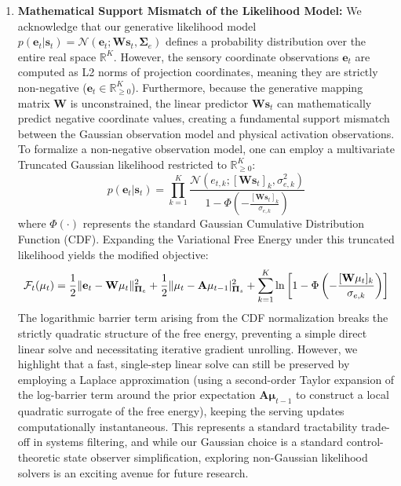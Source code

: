 \documentclass{article}
\theoremstyle{plain}
\theoremstyle{definition}
\theoremstyle{remark}
\begin{document}
\begin{enumerate}
    \item \textbf{Mathematical Support Mismatch of the Likelihood Model:} We acknowledge that our generative likelihood model $p(\mathbf{e}_t | \mathbf{s}_t) = \mathcal{N}(\mathbf{e}_t; \mathbf{W}\mathbf{s}_t, \mathbf{\Sigma}_e)$ defines a probability distribution over the entire real space $\mathbb{R}^K$. However, the sensory coordinate observations $\mathbf{e}_t$ are computed as L2 norms of projection coordinates, meaning they are strictly non-negative ($\mathbf{e}_t \in \mathbb{R}_{\ge 0}^K$). Furthermore, because the generative mapping matrix $\mathbf{W}$ is unconstrained, the linear predictor $\mathbf{W}\mathbf{s}_t$ can mathematically predict negative coordinate values, creating a fundamental support mismatch between the Gaussian observation model and physical activation observations. To formalize a non-negative observation model, one can employ a multivariate Truncated Gaussian likelihood restricted to $\mathbb{R}_{\ge 0}^K$:
    \begin{equation}
    p(\mathbf{e}_t | \mathbf{s}_t) = \prod_{k=1}^K \frac{\mathcal{N}\left(e_{t, k}; [\mathbf{W}\mathbf{s}_t]_k, \sigma_{e, k}^2\right)}{1 - \Phi\left(-\frac{[\mathbf{W}\mathbf{s}_t]_k}{\sigma_{e, k}}\right)}
    \end{equation}
    where $\Phi(\cdot)$ represents the standard Gaussian Cumulative Distribution Function (CDF). Expanding the Variational Free Energy under this truncated likelihood yields the modified objective:
    \begin{equation}
    \mathcal{F}_t(\mathbf{\mu}_t) = \frac{1}{2} \|\mathbf{e}_t - \mathbf{W}\mathbf{\mu}_t\|_{\mathbf{\Pi}_e}^2 + \frac{1}{2} \|\mathbf{\mu}_t - \mathbf{A}\mathbf{\mu}_{t-1}\\|_{\mathbf{\Pi}_s}^2 + \sum_{k=1}^K \ln \left[1 - \Phi\left(-\frac{[\mathbf{W}\mathbf{\mu}_t]_k}{\sigma_{e, k}}\right)\right]
    \end{equation}
    The logarithmic barrier term arising from the CDF normalization breaks the strictly quadratic structure of the free energy, preventing a simple direct linear solve and necessitating iterative gradient unrolling. However, we highlight that a fast, single-step linear solve can still be preserved by employing a Laplace approximation (using a second-order Taylor expansion of the log-barrier term around the prior expectation $\mathbf{A}\mathbf{\mu}_{t-1}$ to construct a local quadratic surrogate of the free energy), keeping the serving updates computationally instantaneous. This represents a standard tractability trade-off in systems filtering, and while our Gaussian choice is a standard control-theoretic state observer simplification, exploring non-Gaussian likelihood solvers is an exciting avenue for future research.


\end{enumerate}
\end{document}
